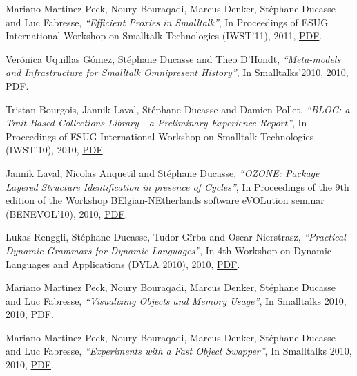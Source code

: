 \documentclass{article}
\newcommand{\czauthors}[1]{#1}
\newcommand{\cztitle}[1]{\emph{``#1''}}
\newcommand{\czbooktitle}[1]{#1}
\begin{document}
\begin{itemize}
	\pub  \czauthors{Mariano Martinez Peck, Noury Bouraqadi, Marcus Denker, St\'ephane Ducasse and Luc Fabresse},  \cztitle{Efficient Proxies in {Smalltalk}},  In \czbooktitle{Proceedings of ESUG International Workshop on Smalltalk Technologies (IWST'11)}, 2011, \href{http://rmod-files.lille.inria.fr/Team/Texts/Papers/Mart11a-IWST11-Ghost.pdf}{PDF}.

	\pub  \czauthors{Ver\'onica Uquillas G\'omez, St\'ephane Ducasse and Theo D'Hondt},  \cztitle{Meta-models and Infrastructure for Smalltalk Omnipresent History},  In \czbooktitle{Smalltalks'2010}, 2010, \href{http://rmod-files.lille.inria.fr/Team/Texts/Papers/Uqui10b-Smalltalk2010-Metamodels.pdf}{PDF}.

	\pub  \czauthors{Tristan Bourgois, Jannik Laval, St\'ephane Ducasse and Damien Pollet},  \cztitle{BLOC: a Trait-Based Collections Library - a Preliminary Experience Report},  In \czbooktitle{Proceedings of ESUG International Workshop on Smalltalk Technologies (IWST'10)}, 2010, \href{http://rmod-files.lille.inria.fr/Team/Texts/Papers/Bour10a-IWST10-bloc.pdf}{PDF}.

	\pub  \czauthors{Jannik Laval, Nicolas Anquetil and St\'ephane Ducasse},  \cztitle{OZONE: Package Layered Structure Identification in presence of Cycles},  In \czbooktitle{Proceedings of the 9th edition of the Workshop BElgian-NEtherlands software eVOLution seminar (BENEVOL'10)}, 2010, \href{http://rmod-files.lille.inria.fr/Team/Texts/Papers/Lava10e-Benevol2010-Layers.pdf}{PDF}.

	\pub  \czauthors{Lukas Renggli, St\'ephane Ducasse, Tudor G\^irba and Oscar Nierstrasz},  \cztitle{Practical Dynamic Grammars for Dynamic Languages},  In \czbooktitle{4th Workshop on Dynamic Languages and Applications (DYLA 2010)}, 2010, \href{http://rmod-files.lille.inria.fr/Team/Texts/Papers/Reng10cDynamicGrammars.pdf}{PDF}.

	\pub  \czauthors{Mariano Martinez Peck, Noury Bouraqadi, Marcus Denker, St\'ephane Ducasse and Luc Fabresse},  \cztitle{Visualizing Objects and Memory Usage},  In \czbooktitle{Smalltalks 2010}, 2010, \href{http://rmod-files.lille.inria.fr/Team/Texts/Papers/Mart10a-Smalltalks2010-VisualizingUnusedObjects.pdf}{PDF}.

	\pub  \czauthors{Mariano Martinez Peck, Noury Bouraqadi, Marcus Denker, St\'ephane Ducasse and Luc Fabresse},  \cztitle{Experiments with a Fast Object Swapper},  In \czbooktitle{Smalltalks 2010}, 2010, \href{http://rmod-files.lille.inria.fr/Team/Texts/Papers/Mart10b-Smalltalks2010-Swapper-ImageSegments.pdf}{PDF}.


\end{itemize}
\end{document}
